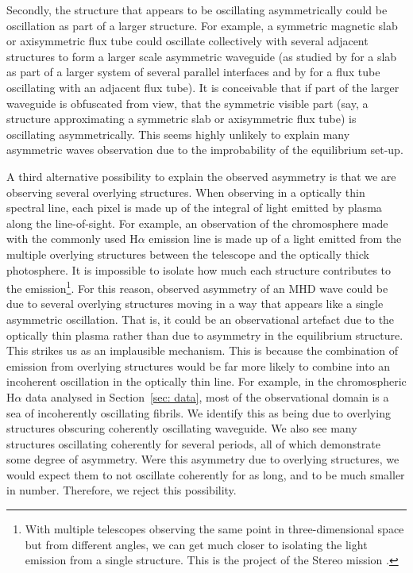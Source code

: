 Secondly, the structure that appears to be oscillating asymmetrically could be oscillation as part of a larger structure. For example, a symmetric magnetic slab or axisymmetric flux tube could oscillate collectively with several adjacent structures to form a larger scale asymmetric waveguide (as studied by \cite{shu_etal18} for a slab as part of a larger system of several parallel interfaces and by \cite{van_etal08} for a flux tube oscillating with an adjacent flux tube). It is conceivable that if part of the larger waveguide is obfuscated from view, that the symmetric visible part (say, a structure approximating a symmetric slab or axisymmetric flux tube) is oscillating asymmetrically. This seems highly unlikely to explain many asymmetric waves observation due to the improbability of the equilibrium set-up.

A third alternative possibility to explain the observed asymmetry is that we are observing several overlying structures. When observing in a optically thin spectral line, each pixel is made up of the integral of light emitted by plasma along the line-of-sight. For example, an observation of the chromosphere made with the commonly used H$\alpha$ emission line is made up of a light emitted from the multiple overlying structures between the telescope and the optically thick photosphere. It is impossible to isolate how much each structure contributes to the emission\footnote{With multiple telescopes observing the same point in three-dimensional space but from different angles, we can get much closer to isolating the light emission from a single structure. This is the project of the Stereo mission \citep{stereo}.}. For this reason, observed asymmetry of an MHD wave could be due to several overlying structures moving in a way that appears like a single asymmetric oscillation. That is, it could be an observational artefact due to the optically thin plasma rather than due to asymmetry in the equilibrium structure. This strikes us as an implausible mechanism. This is because the combination of emission from overlying structures would be far more likely to combine into an incoherent oscillation in the optically thin line. For example, in the chromospheric H$\alpha$ data analysed in Section~\ref{sec: data}, most of the observational domain is a sea of incoherently oscillating fibrils. We identify this as being due to overlying structures obscuring coherently oscillating waveguide. We also see many structures oscillating coherently for several periods, all of which demonstrate some degree of asymmetry. Were this asymmetry due to overlying structures, we would expect them to not oscillate coherently for as long, and to be much smaller in number. Therefore, we reject this possibility.


